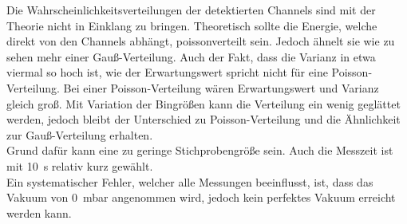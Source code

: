 \noindent Die Wahrscheinlichkeitsverteilungen der detektierten Channels sind mit der Theorie nicht in Einklang zu bringen. 
Theoretisch sollte die Energie, welche direkt von den Channels abhängt, poissonverteilt sein. Jedoch ähnelt sie 
wie zu sehen mehr einer Gauß-Verteilung. Auch der Fakt, dass die Varianz in etwa viermal so hoch ist, wie der 
Erwartungswert spricht nicht für eine Poisson-Verteilung. Bei einer Poisson-Verteilung wären Erwartungswert und Varianz 
gleich groß. Mit Variation der Bingrößen kann die Verteilung ein wenig geglättet werden, jedoch bleibt der Unterschied 
zu Poisson-Verteilung und die Ähnlichkeit zur Gauß-Verteilung erhalten. \\
\noindent Grund dafür kann eine zu geringe Stichprobengröße sein. Auch die Messzeit ist mit \qty{10}{\second} relativ 
kurz gewählt.\\
\noindent Ein systematischer Fehler, welcher alle Messungen beeinflusst, ist, dass das Vakuum von \qty{0}{\milli \bar} 
angenommen wird, jedoch kein perfektes Vakuum erreicht werden kann.


%
